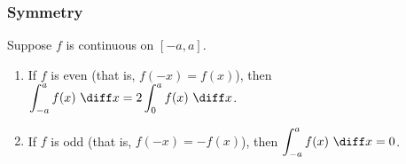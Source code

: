 \begin{frame}
\frametitle{Symmetry}
\begin{theorem}
Suppose $f$ is continuous on $[-a, a]$.
\begin{enumerate}
\item  If $f$ is even (that is, $f(-x) = f(x)$), then $\displaystyle \int_{-a}^a f(x) \ \diff x = 2\int_0^a f(x) \ \diff x$.
\item  If $f$ is odd (that is, $f(-x) = -f(x)$), then $\displaystyle \int_{-a}^a f(x) \ \diff x = 0$.
\end{enumerate}
\end{theorem}
\end{frame}

